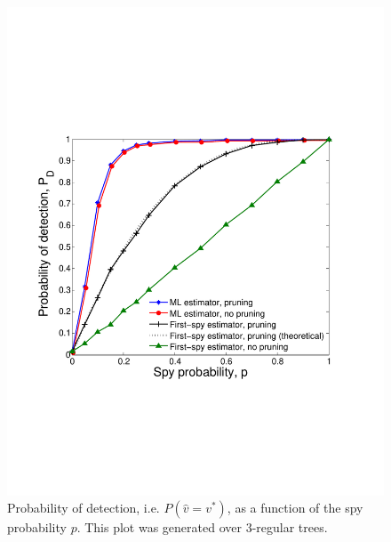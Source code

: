 \begin{figure}
  \begin{minipage}[c]{0.49\linewidth}
    \centering
    \includegraphics[width=0.9\linewidth]{figures/pd_vs_spies}
    \caption{Probability of detection, i.e. $P(\hat v = v^*)$, as a function of the spy probability $p$. This plot was generated over 3-regular trees. %
    }
    \label{fig:pd_vs_spies}
  \end{minipage}
  \hfill
  \begin{minipage}[c]{0.49\linewidth}
    \centering

\end{minipage}
\end{figure}
